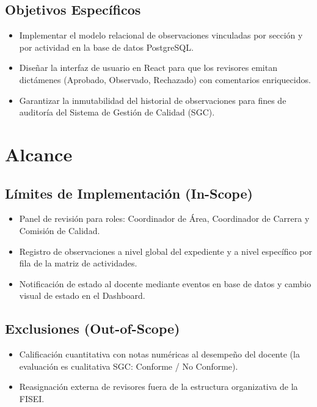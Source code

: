 \documentclass[12pt,a4paper]{article}
\begin{document}
\subsection{Objetivos Específicos}
\begin{itemize}[leftmargin=1.5em, itemsep=1.5pt]
    \item Implementar el modelo relacional de observaciones vinculadas por sección y por actividad en la base de datos PostgreSQL.
    \item Diseñar la interfaz de usuario en React para que los revisores emitan dictámenes (Aprobado, Observado, Rechazado) con comentarios enriquecidos.
    \item Garantizar la inmutabilidad del historial de observaciones para fines de auditoría del Sistema de Gestión de Calidad (SGC).
\end{itemize}

\section{Alcance}

\subsection{Límites de Implementación (In-Scope)}
\begin{itemize}[leftmargin=1.5em, itemsep=1.5pt]
    \item Panel de revisión para roles: Coordinador de Área, Coordinador de Carrera y Comisión de Calidad.
    \item Registro de observaciones a nivel global del expediente y a nivel específico por fila de la matriz de actividades.
    \item Notificación de estado al docente mediante eventos en base de datos y cambio visual de estado en el Dashboard.
\end{itemize}

\subsection{Exclusiones (Out-of-Scope)}
\begin{itemize}[leftmargin=1.5em, itemsep=1.5pt]
    \item Calificación cuantitativa con notas numéricas al desempeño del docente (la evaluación es cualitativa SGC: Conforme / No Conforme).
    \item Reasignación externa de revisores fuera de la estructura organizativa de la FISEI.
\end{itemize}
\end{document}
